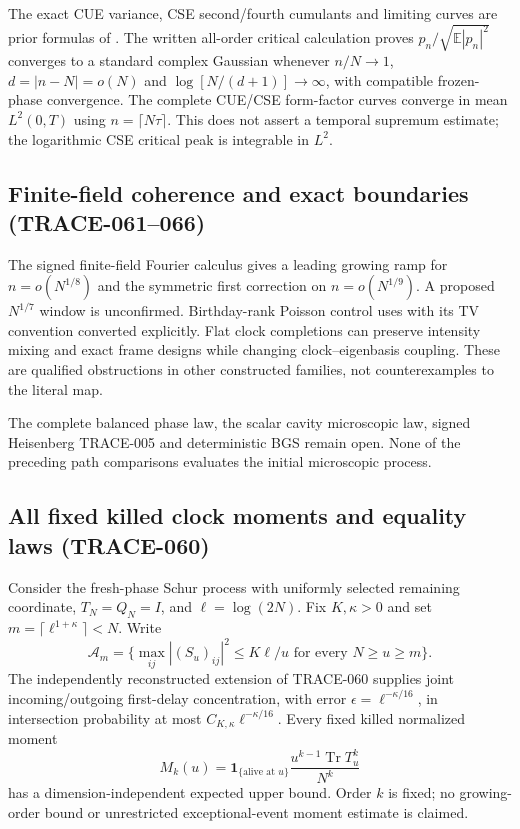 The exact CUE variance, CSE second/fourth cumulants and limiting curves
are prior formulas of \cite{HSW1999Chat}. The written all-order critical
calculation proves $p_n/\sqrt{\mathbb E|p_n|^2}$ converges to a standard
complex Gaussian whenever $n/N\to1$, $d=|n-N|=o(N)$ and
$\log[N/(d+1)]\to\infty$, with compatible frozen-phase convergence.
The complete CUE/CSE form-factor curves converge in mean $L^2(0,T)$ using
$n=\lceil N\tau\rceil$. This does not assert a temporal supremum estimate;
the logarithmic CSE critical peak is integrable in $L^2$.

\subsection{Finite-field coherence and exact boundaries (TRACE-061--066)}
The signed finite-field Fourier calculus gives a leading growing ramp for
$n=o(N^{1/8})$ and the symmetric first correction on $n=o(N^{1/9})$.
A proposed $N^{1/7}$ window is unconfirmed. Birthday-rank Poisson control
uses \cite{AGG1989Chat} with its TV convention converted explicitly.
Flat clock completions can preserve intensity mixing and exact frame designs
while changing clock--eigenbasis coupling. These are qualified obstructions
in other constructed families, not counterexamples to the literal map.

The complete balanced phase law, the scalar cavity microscopic law, signed
Heisenberg TRACE-005 and deterministic BGS remain open. None of the preceding
path comparisons evaluates the initial microscopic process.

\subsection{All fixed killed clock moments and equality laws (TRACE-060)}
Consider the fresh-phase Schur process with uniformly selected remaining
coordinate, $T_N=Q_N=I$, and $\ell=\log(2N)$. Fix $K,\kappa>0$ and set
$m=\lceil\ell^{1+\kappa}\rceil<N$. Write
\[
 \mathcal A_m=\{\max_{ij}|(S_u)_{ij}|^2\le K\ell/u
                      \text{ for every }N\ge u\ge m\}.
\]
The independently reconstructed extension of TRACE-060 supplies joint
incoming/outgoing first-delay concentration, with error
$\epsilon=\ell^{-\kappa/16}$, in intersection probability at most
$C_{K,\kappa}\ell^{-\kappa/16}$. Every fixed killed normalized moment
\[
 M_k(u)=\mathbf1_{\{\text{alive at }u\}}
                 \frac{u^{k-1}\operatorname{Tr}T_u^k}{N^k}
\]
has a dimension-independent expected upper bound. Order $k$ is fixed;
no growing-order bound or unrestricted exceptional-event moment estimate
is claimed.

